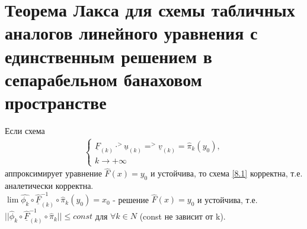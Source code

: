 \documentclass[__main__.tex]{subfiles}
\begin{document}
\section{Теорема Лакса для схемы табличных аналогов линейного уравнения с единственным решением в сепарабельном банаховом пространстве}

Если схема
\begin{gather}
\label{8.1}
\begin{cases}
\underline{F}_{(k)} \cdot ^{>} \underline{u}_{(k)} = ^{>}\underline{v}_{(k)} = \hat{\pi}_{k} (y_0),\\
k \to +\infty
\end{cases}
\end{gather}
аппроксимирует уравнение $\hat{F}(x) = y_0$ и устойчива, то схема \ref{8.1} корректна, т.е. аналетически корректна.\\
$\lim \hat{\phi_k} \circ \underline{\hat{F}}_{(k)}^{-1} \circ \hat{\pi}_{k} (y_0) = x_0$ - решение $\hat{F}(x) = y_0$ и устойчива, т.е. $|| \hat{\phi}_{k} \circ \underline{\hat{F}}_{(k)}^{-1} \circ \hat{\pi}_k|| \leq const$ для $\forall k \in N$ (const не зависит от k).\\
\end{document}
